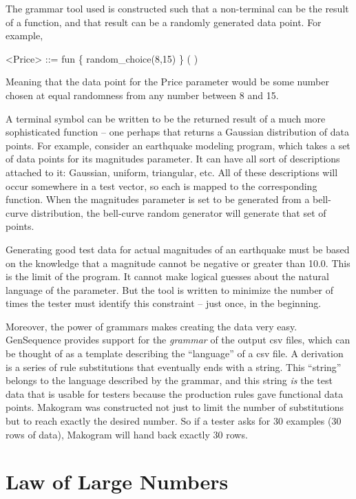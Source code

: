 The grammar tool used is constructed such that a non-terminal can be the result of a function, and that result can be a randomly generated data point. For example,

\begin{grammar}
<Price> ::= fun \{ random_choice(8,15) \} ( )
\end{grammar}

Meaning that the data point for the Price parameter would be some number chosen at equal randomness from any number between 8 and 15.

A terminal symbol can be written to be the returned result of a much more sophisticated function -- one perhaps that returns a Gaussian distribution of data points. For example, consider an earthquake modeling program, which takes a set of data points for its magnitudes parameter. It can have all sort of descriptions attached to it: Gaussian, uniform, triangular, etc. All of these descriptions will occur somewhere in a test vector, so each is mapped to the corresponding function. When the magnitudes parameter is set to be generated from a bell-curve distribution, the bell-curve random generator will generate that set of points.

Generating good test data for actual magnitudes of an earthquake must be based on the knowledge that a magnitude cannot be negative or greater than 10.0. This is the limit of the program. It cannot make logical guesses about the natural language of the parameter. But the tool is written to minimize the number of times the tester must identify this constraint -- just once, in the beginning.

Moreover, the power of grammars makes creating the data very easy. GenSequence provides support for the \textit{grammar} of the output csv files, which can be thought of as a template describing the ``language'' of a csv file. A derivation is a series of rule substitutions that eventually ends with a string. This ``string'' belongs to the language described by the grammar, and this string \textit{is} the test data that is usable for testers because the production rules gave functional data points. Makogram was constructed not just to limit the number of substitutions but to reach exactly the desired number. So if a tester asks for 30 examples (30 rows of data), Makogram will hand back exactly 30 rows.

\section{Law of Large Numbers}

